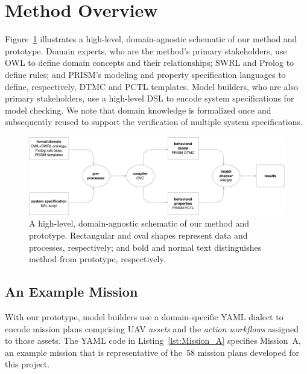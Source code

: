 \section{Method Overview}
\label{sec:Method_Overview}

\noindent Figure~\ref{fig:method_and_prototype_schematic} illustrates a high-level, domain-agnostic schematic of our method and prototype. Domain experts, who are the method's primary stakeholders, use OWL to define domain concepts and their relationships; SWRL and Prolog to define rules; and PRISM's modeling and property specification languages to define, respectively, DTMC and PCTL templates. Model builders, who are also primary stakeholders, use a high-level DSL to encode system specifications for model checking. We note that domain knowledge is formalized once and subsequently reused to support the verification of multiple system specifications.

\begin{figure}
\centering
\includegraphics[scale=0.54]{img/schematic.pdf}
\caption{A high-level, domain-agnostic schematic of our method and prototype. Rectangular and oval shapes represent data and processes, respectively; and bold and normal text distinguishes method from prototype, respectively.}
\label{fig:method_and_prototype_schematic}
\end{figure}

\subsection{An Example Mission}
\label{sec:An_Example_Mission}

\noindent With our prototype, model builders use a domain-specific YAML dialect to encode mission plans comprising UAV \emph{assets} and the \emph{action workflows} assigned to those assets. The YAML code in Listing~\ref{lst:Mission_A} specifies Mission~A, an example mission that is representative of the~58 mission plans developed for this project.


